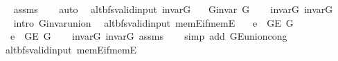 \begin{isabellebody}
%
\isadelimproof
\ \ %
\endisadelimproof
%
\isatagproof
{}\isamarkupfalse%
\ assms\isanewline
\ \ \isamarkupfalse%
\ auto%
\endisatagproof
{\isafoldproof}%
%
\isadelimproof
\isanewline
%
\endisadelimproof
\isanewline
{}\isamarkupfalse%
\ {\isacharparenleft}{\kern0pt}\ alt{\isacharunderscore}{\kern0pt}bfs{\isacharunderscore}{\kern0pt}valid{\isacharunderscore}{\kern0pt}input{\isacharparenright}{\kern0pt}\ invar{\isacharunderscore}{\kern0pt}G{\isacharcolon}{\kern0pt}\isanewline
\ \ \ {\isachardoublequoteopen}G{\isachardot}{\kern0pt}invar\ G{\isachardoublequoteclose}\isanewline
%
\isadelimproof
\ \ %
\endisadelimproof
%
\isatagproof
{}\isamarkupfalse%
\ invar{\isacharunderscore}{\kern0pt}G{}\ invar{\isacharunderscore}{\kern0pt}G{}\isanewline
\ \ \isamarkupfalse%
\ {\isacharparenleft}{\kern0pt}intro\ G{\isachardot}{\kern0pt}invar{\isacharunderscore}{\kern0pt}union{\isacharparenright}{\kern0pt}%
\endisatagproof
{\isafoldproof}%
%
\isadelimproof
\isanewline
%
\endisadelimproof
\isanewline
{}\isamarkupfalse%
\ {\isacharparenleft}{\kern0pt}\ alt{\isacharunderscore}{\kern0pt}bfs{\isacharunderscore}{\kern0pt}valid{\isacharunderscore}{\kern0pt}input{\isacharparenright}{\kern0pt}\ mem{\isacharunderscore}{\kern0pt}E{\isacharunderscore}{\kern0pt}if{\isacharunderscore}{\kern0pt}mem{\isacharunderscore}{\kern0pt}E{}{\isacharcolon}{\kern0pt}\isanewline
\ \ \ {\isachardoublequoteopen}e\ {\isasymin}\ G{\isachardot}{\kern0pt}E\ G{}{\isachardoublequoteclose}\isanewline
\ \ \ {\isachardoublequoteopen}e\ {\isasymin}\ G{\isachardot}{\kern0pt}E\ G{\isachardoublequoteclose}\isanewline
%
\isadelimproof
\ \ %
\endisadelimproof
%
\isatagproof
{}\isamarkupfalse%
\ invar{\isacharunderscore}{\kern0pt}G{}\ invar{\isacharunderscore}{\kern0pt}G{}\ assms\isanewline
\ \ \isamarkupfalse%
\ {\isacharparenleft}{\kern0pt}simp\ add{\isacharcolon}{\kern0pt}\ G{\isachardot}{\kern0pt}E{\isacharunderscore}{\kern0pt}union{\isacharunderscore}{\kern0pt}cong{\isacharparenright}{\kern0pt}%
\endisatagproof
{\isafoldproof}%
%
\isadelimproof
\isanewline
%
\endisadelimproof
\isanewline
{}\isamarkupfalse%
\ {\isacharparenleft}{\kern0pt}\ alt{\isacharunderscore}{\kern0pt}bfs{\isacharunderscore}{\kern0pt}valid{\isacharunderscore}{\kern0pt}input{\isacharparenright}{\kern0pt}\ mem{\isacharunderscore}{\kern0pt}E{\isacharunderscore}{\kern0pt}if{\isacharunderscore}{\kern0pt}mem{\isacharunderscore}{\kern0pt}E{}{\isacharcolon}{\kern0pt}\isanewline

\end{isabellebody}
